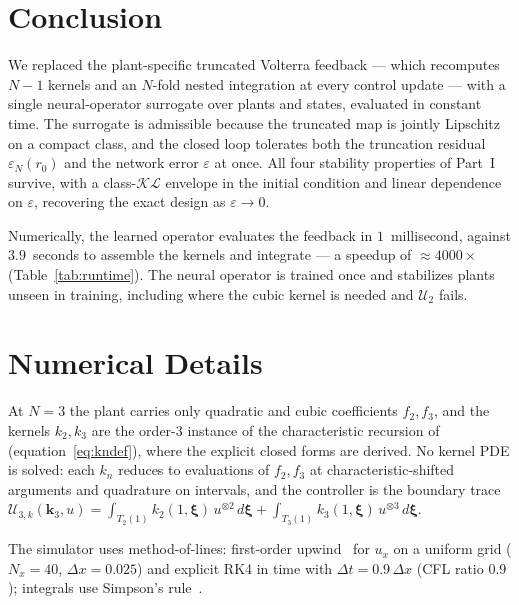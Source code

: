 \documentclass[twocolumn,amsthm]{autart}
\newcommand{\eps}{\varepsilon}
\theoremstyle{plain}
\theoremstyle{definition}
\begin{document}
\section{Conclusion}
\label{sec:conclusion}

We replaced the plant-specific truncated Volterra feedback --- which recomputes $N-1$ kernels and an $N$-fold nested integration at every control update --- with a single neural-operator surrogate over plants and states, evaluated in constant time. The surrogate is admissible because the truncated map is jointly Lipschitz on a compact class, and the closed loop tolerates both the truncation residual $\eps_N(r_0)$ and the network error $\eps$ at once. All four stability properties of Part~I survive, with a class-$\mathcal{KL}$ envelope in the initial condition and linear dependence on $\eps$, recovering the exact design as $\eps \to 0$.

Numerically, the learned operator evaluates the feedback in $1$~millisecond, against $3.9$~seconds to assemble the kernels and integrate --- a speedup of $\approx 4000\times$  (Table~\ref{tab:runtime}). The neural operator is trained once and stabilizes plants unseen in training, including where the cubic kernel is needed and $\mathcal{U}_2$ fails.

\appendix
\section{Numerical Details}
\label{app:numerical-details}
\label{subsec:plant-controller}
\label{appendix:numerical-solver-details}
\label{appendix:neural-operator-design}

At $N=3$ the plant carries only quadratic and cubic coefficients $f_2, f_3$, and the kernels $k_2, k_3$ are the order-$3$ instance of the characteristic recursion of~\cite{krstic2026feedbacklinearizationhyperbolicpdes} (equation~\eqref{eq:kndef}), where the explicit closed forms are derived. No kernel PDE is solved: each $k_n$ reduces to evaluations of $f_2, f_3$ at characteristic-shifted arguments and quadrature on intervals, and the controller is the boundary trace $\mathcal{U}_{3,k}(\mathbf{k}_3, u) = \int_{T_2(1)} k_2(1,\bm\xi)\, u^{\otimes 2}\, d\bm\xi + \int_{T_3(1)} k_3(1,\bm\xi)\, u^{\otimes 3}\, d\bm\xi$.

The simulator uses method-of-lines: first-order upwind~\cite{leveque2007finite} for $u_x$ on a uniform grid ($N_x = 40$, $\Delta x = 0.025$) and explicit RK4 in time with $\Delta t = 0.9\,\Delta x$ (CFL ratio $0.9$); integrals use Simpson's rule~\cite{burden2015numerical}.
\end{document}
